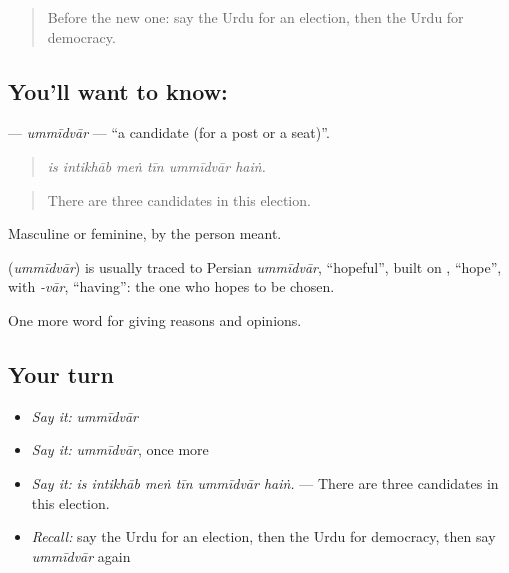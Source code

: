 \label{lesson:UR-C342-ummidvar}



\begin{quote}
Before the new one: say the Urdu for an election, then the Urdu for democracy.
\end{quote}

\subsection*{You'll want to know: }
\textbf{} — \emph{ummīdvār} — \textquotedblleft{}a candidate (for a post or a seat)\textquotedblright{}.

\begin{quote}
     
\end{quote}

\begin{quote}
\emph{is intikhāb meṅ tīn ummīdvār haiṅ.}
\end{quote}

\begin{quote}
There are three candidates in this election.
\end{quote}

Masculine or feminine, by the person meant.

\begin{cousinweb}
\textbf{} (\emph{ummīdvār}) is usually traced to Persian \emph{ummīdvār}, \textquotedblleft{}hopeful\textquotedblright{}, built on \textbf{}, \textquotedblleft{}hope\textquotedblright{}, with \emph{-vār}, \textquotedblleft{}having\textquotedblright{}: the one who hopes to be chosen.
\end{cousinweb}

\begin{grammarlens}[title={What you've built}]
One more word for giving reasons and opinions.
\end{grammarlens}

\subsection*{Your turn}
\begin{itemize}
\raggedright
  \item \emph{Say it:} \emph{ummīdvār}
  \item \emph{Say it:} \emph{ummīdvār}, once more
  \item \emph{Say it:} \emph{is intikhāb meṅ tīn ummīdvār haiṅ.} — There are three candidates in this election.
  \item \emph{Recall:} say the Urdu for an election, then the Urdu for democracy, then say \emph{ummīdvār} again
\end{itemize}

